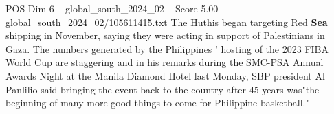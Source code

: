 \begin{textsample}{POS Dim 6 – global\_south\_2024\_02 – Score 5.00 – global\_south\_2024\_02/105611415.txt}
The Huthis began targeting Red \textbf{Sea} shipping in November, saying they were acting in support of Palestinians in Gaza.
The numbers generated by the Philippines ' hosting of the 2023 FIBA World Cup are staggering and in his remarks during the SMC-PSA Annual Awards Night at the Manila Diamond Hotel last Monday, SBP president Al Panlilio said bringing the event back to the country after 45 years was"the beginning of many more good things to come for Philippine basketball."

\end{textsample}
